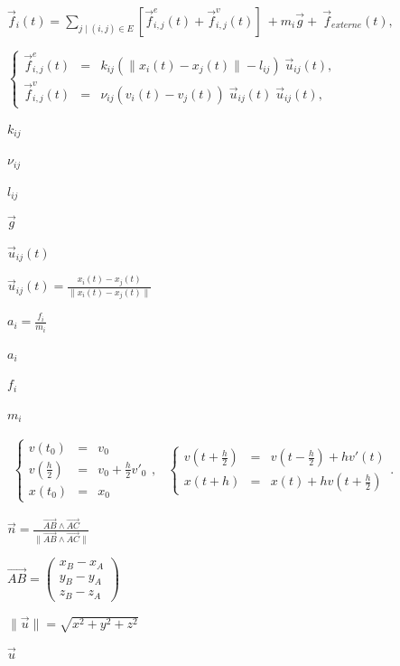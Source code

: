 \documentclass{article}
\begin{document}
$ \vec{f}_i(t) = \sum_{j\mid(i,j)\in   E}  \left[\vec{f}^{e}_{i,j}(t) + \vec{f}^{v}_{i,j}(t) \right] \: +  m_i \vec{g} +\:  \vec{f}_{externe}(t),$
\pagebreak

$
  \left\{
  \begin{array}{lcl}
  \vec{f}^{e}_{i,j}(t) &=& k_{ij} \left(\|x_i(t) - x_j(t)\| - l_{ij}\right)\;  \vec{u}_{ij}(t),\\
  \vec{f}^{v}_{i,j}(t) &=& {\nu}_{ij}  \left(v_i(t) -  v_j(t)\right) \; \vec{u}_{ij}(t) \; \vec{u}_{ij}(t),
  \end{array}
  \right.
  $
\pagebreak

$k_{ij}$
\pagebreak

${\nu}_{ij}$
\pagebreak

$l_{ij}$
\pagebreak

$\vec{g}$
\pagebreak

$\vec{u}_{ij}(t)$
\pagebreak

$ \vec{u}_{ij}(t) = \frac{x_i(t) - x_j(t)}{\|x_i(t) - x_j(t)\|} $
\pagebreak

$ a_i = \frac{f_i}{m_i} $
\pagebreak

$a_i$
\pagebreak

$f_i $
\pagebreak

$m_i $
\pagebreak

$
  \begin{array}{lr}
  \left\{
  \begin{array}{ccl}
  v(t_0)   &=&   v_0\\
  v(\frac{h}{2}) &=& v_0 + \frac{h}{2}v'_0\\
  x(t_0) &=& x_0
  \end{array}
  \right., 
  & 
  \left\{
  \begin{array}{ccl}
  v(t+\frac{h}{2}) &=& v(t-\frac{h}{2}) + hv'(t) \\ 
  x(t+h) &=& x(t) + hv(t+\frac{h}{2}) 
  \end{array}
  \right..
  \end{array}
  $
\pagebreak

$\vec{n} = \frac{\vec{AB} \wedge \vec{AC}}{\| \vec{AB} \wedge \vec{AC} \|}$
\pagebreak

$\vec{AB} = \left(
  \begin{array}{c}
  x_B - x_A\\
  y_B - y_A \\
  z_B - z_A
  \end{array}
  \right) $
\pagebreak

$ \|\vec{u}\| = \sqrt{x^2 + y^2 + z^2} $
\pagebreak

$ \vec{u} $
\pagebreak
\end{document}
